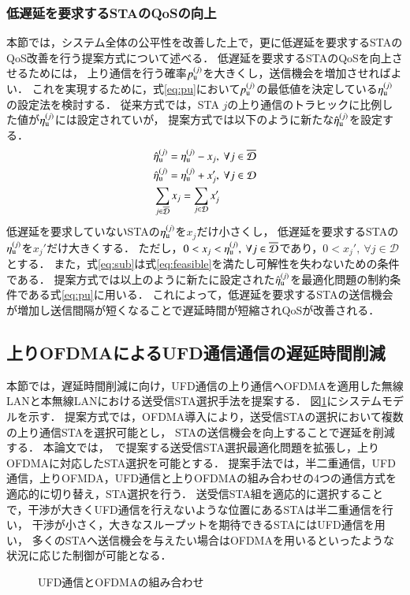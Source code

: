 \documentclass[master]{kuisthesis}		%
\newcommand{\etau}{\eta_{\rm u}^{(j)}}
\begin{document}
		\subsubsection{低遅延を要求するSTAのQoSの向上}
			本節では，システム全体の公平性を改善した上で，更に低遅延を要求するSTAのQoS改善を行う提案方式について述べる．
			低遅延を要求するSTAのQoSを向上させるためには，
			上り通信を行う確率$p_{\rm u}^{(j)}$を大きくし，送信機会を増加させればよい．
			これを実現するために，式\eqref{eq:pu}において$p_{\rm u}^{(j)}$の最低値を決定している$\etau$の設定法を検討する．
			従来方式では，STA $j$の上り通信のトラヒックに比例した値が$\etau$には設定されていが，
			提案方式では以下のように新たな${\hat \eta}_{\rm u}^{(j)}$を設定する．
			\begin{align}
				&{\hat \eta}_{\rm u}^{(j)} = \etau -x_j,\ \forall j \in {\overline {\mathcal D}} \label{eq:etadbar}\\
				&{\hat \eta}_{\rm u}^{(j)} = \etau + x_j',\ \forall j \in {\mathcal D} \label{eq:etad}\\
				&\sum_{j\in{\overline {\mathcal D}}} x_j = \sum_{j\in{\mathcal D}} x_j' \label{eq:sub}
				\end{align}
			低遅延を要求していないSTAの$\etau$を$x_j$だけ小さくし，
			低遅延を要求するSTAの$\etau$を$x_j'$だけ大きくする．
			ただし，$0<x_j<\etau,\ \forall j\in{{\overline {\mathcal D}}}$であり，$0<x_j',\ \forall j\in{\mathcal D}$とする．
			また，式\eqref{eq:sub}は式\eqref{eq:feasible}を満たし可解性を失わないための条件である．
			提案方式では以上のように新たに設定された${\hat \eta}_{\rm u}^{(j)}$を最適化問題の制約条件である式\eqref{eq:pu}に用いる．
			これによって，低遅延を要求するSTAの送信機会が増加し送信間隔が短くなることで遅延時間が短縮されQoSが改善される．
		\subsection{上りOFDMAによるUFD通信通信の遅延時間削減}
			本節では，遅延時間削減に向け，UFD通信の上り通信へOFDMAを適用した無線LANと本無線LANにおける送受信STA選択手法を提案する．
			図\ref{fig:ofdma}にシステムモデルを示す．
			提案方式では，OFDMA導入により，送受信STAの選択において複数の上り通信STAを選択可能とし，
			STAの送信機会を向上することで遅延を削減する．
			本論文では，~\cite{promac_fair}で提案する送受信STA選択最適化問題を拡張し，上りOFDMAに対応したSTA選択を可能とする．
			提案手法では，半二重通信，UFD通信，上りOFMDA，UFD通信と上りOFDMAの組み合わせの4つの通信方式を適応的に切り替え，STA選択を行う．
			送受信STA組を適応的に選択することで，干渉が大きくUFD通信を行えないような位置にあるSTAは半二重通信を行い，
			干渉が小さく，大きなスループットを期待できるSTAにはUFD通信を用い，
			多くのSTAへ送信機会を与えたい場合はOFDMAを用いるといったような状況に応じた制御が可能となる．
			\begin{figure}[t]
				\centering
				\caption{UFD通信とOFDMAの組み合わせ}
				\label{fig:ofdma}
			\end{figure}
\end{document}
